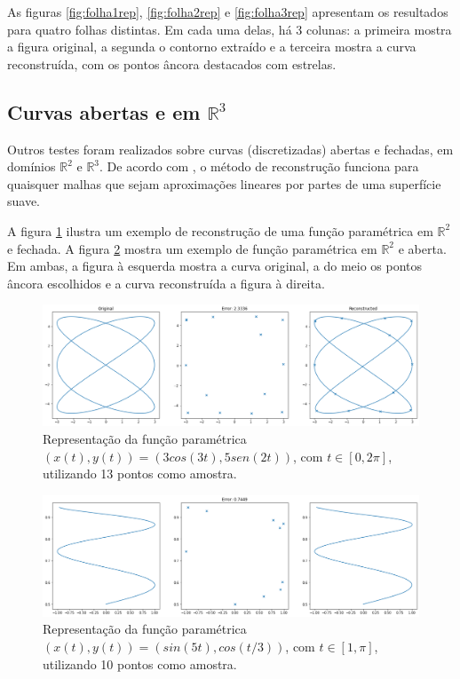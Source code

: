 As figuras \ref{fig:folha1rep}, \ref{fig:folha2rep} e \ref{fig:folha3rep} apresentam os resultados para quatro folhas distintas. Em cada uma delas, há 3 colunas: a primeira mostra a figura original, a segunda o contorno extraído e a terceira mostra a curva reconstruída, com os pontos âncora destacados com estrelas.

\subsection{Curvas abertas e em $\mathbb{R}^3$}

Outros testes foram realizados sobre curvas (discretizadas) abertas e fechadas, em domínios $\mathbb{R}^2$ e $\mathbb{R}^3$. De acordo com , o método de reconstrução funciona para quaisquer malhas que sejam aproximações lineares por partes de uma superfície suave.

A figura \ref{fig:c2d1} ilustra um exemplo de reconstrução de uma função paramétrica em $\mathbb{R}^2$ e fechada. A figura \ref{fig:c2d2} mostra um exemplo de função paramétrica em $\mathbb{R}^2$ e aberta. Em ambas, a figura à esquerda mostra a curva original, a do meio os pontos âncora escolhidos e a curva reconstruída a figura à direita.

\begin{figure}[H]
	\centering
	\includegraphics[width=1\textwidth]{img/res/closed2d.png}
	\caption{Representação da função paramétrica $(x(t), y(t)) = (3 cos(3t), 5sen(2t))$, com $t \in [0, 2\pi]$, utilizando 13 pontos como amostra.}
	\label{fig:c2d1}
\end{figure}

\begin{figure}[H]
	\centering
	\includegraphics[width=1\textwidth]{img/res/open2d.png}
	\caption{Representação da função paramétrica $(x(t), y(t)) = (sin(5t), cos(t/3))$, com $t \in [1, \pi]$, utilizando 10 pontos como amostra.}
	\label{fig:c2d2}
\end{figure}

